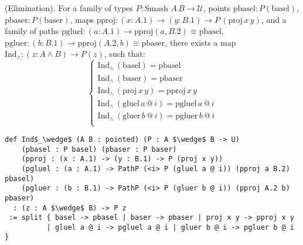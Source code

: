 \begin{theorem} (Elimination).
For a family of types \( P : \text{Smash } A \, B \to \mathcal{U} \),
points \( \text{pbasel} : P(\text{basel}) \),
         \( \text{pbaser} : P(\text{baser}) \), maps
\( \text{pproj} : (x : A.1) \to (y : B.1) \to P \, (\text{proj} \, x \, y) \),
and a family of paths
\( \text{pgluel} : (a : A.1) \to \text{pproj}(a,B.2) \equiv \text{pbasel} \),
\( \text{pgluer} : (b : B.1) \to \text{pproj}(A.2,b) \equiv \text{pbaser} \),
there exists a map \( \text{Ind}_\wedge : (z : A \wedge B) \to P(z) \), such that:
\[
\begin{cases}
\text{Ind}_\wedge \, (\text{basel}) = \text{pbasel} \\
\text{Ind}_\wedge \, (\text{baser}) = \text{pbaser} \\
\text{Ind}_\wedge \, (\text{proj} \, x \, y) = \text{pproj} \, x \, y \\
\text{Ind}_\wedge \, (\text{gluel} \, a \, @ \, i) = \text{pgluel} \, a \, @ \, i \\
\text{Ind}_\wedge \, (\text{gluer} \, b \, @ \, i) = \text{pgluer} \, b \, @ \, i \\
\end{cases}
\]
\begin{lstlisting}[mathescape=true]
def Ind$_\wedge$ (A B : pointed) (P : A $\wedge$ B -> U)
    (pbasel : P basel) (pbaser : P baser)
    (pproj : (x : A.1) -> (y : B.1) -> P (proj x y))
    (pgluel : (a : A.1) -> PathP (<i> P (gluel a @ i)) (pproj a B.2) pbasel)
    (pgluer : (b : B.1) -> PathP (<i> P (gluer b @ i)) (pproj A.2 b) pbaser)
  : (z : A $\wedge$ B) -> P z
 := split { basel -> pbasel | baser -> pbaser | proj x y -> pproj x y
          | gluel a @ i -> pgluel a @ i | gluer b @ i -> pgluer b @ i }
\end{lstlisting}
\end{theorem}

